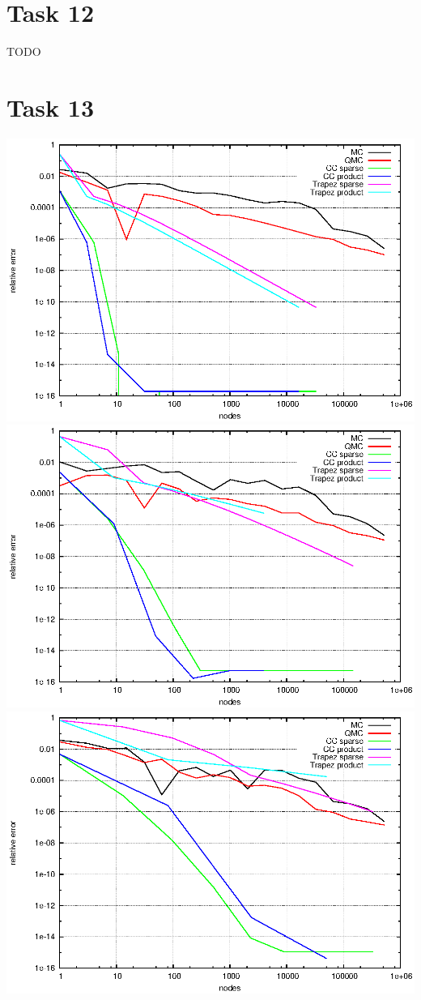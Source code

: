 \documentclass[]{article}
\begin{document}
\section*{Task 12}
TODO

\section*{Task 13}
\includegraphics{task13_d1}\\
\includegraphics{task13_d2}\\
\includegraphics{task13_d4}\\
\end{document}
